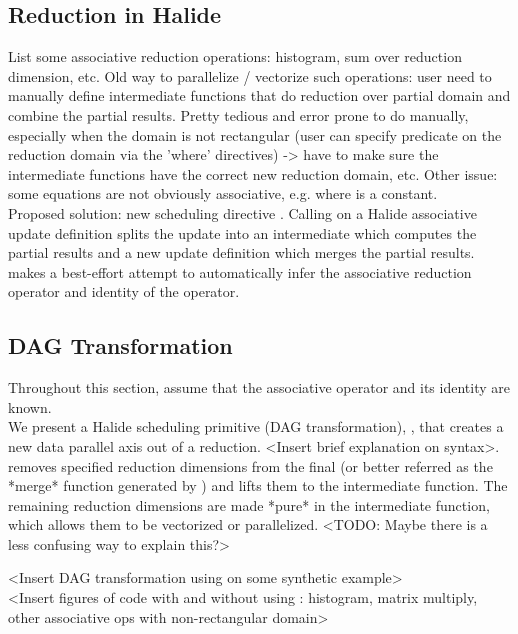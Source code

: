 \subsection{Reduction in Halide}

List some associative reduction operations: histogram, sum over reduction dimension, etc. Old way to parallelize / vectorize such operations: user need to manually define intermediate functions that do reduction over partial domain and combine the partial results. Pretty tedious and error prone to do manually, especially when the domain is not rectangular (user can specify predicate on the reduction domain via the 'where' directives) -> have to make sure the intermediate functions have the correct new reduction domain, etc. Other issue: some equations are not obviously associative, e.g.  where  is a constant. \\

Proposed solution: new scheduling directive . Calling  on a Halide associative update definition splits the update into an intermediate which computes the partial results and a new update definition which merges the partial results.  makes a best-effort attempt to automatically infer the associative reduction operator and identity of the operator.

\subsection{ DAG Transformation}

Throughout this section, assume that the associative operator and its identity are known. \\

We present a Halide scheduling primitive (DAG transformation), , that creates a new data parallel axis out of a reduction. <Insert brief explanation on  syntax>.  removes specified reduction dimensions from the final (or better referred as the *merge* function generated by ) and lifts them to the intermediate function. The remaining reduction dimensions are made *pure* in the intermediate function, which allows them to be vectorized or parallelized. <TODO: Maybe there is a less confusing way to explain this?>

<Insert DAG transformation using  on some synthetic example> \\

<Insert figures of code with and without using : histogram, matrix multiply, other associative ops with non-rectangular domain> \\


